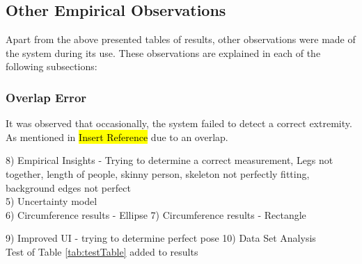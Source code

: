 \subsection{Other Empirical Observations}

Apart from the above presented tables of results, other observations were made of the system during its use. These observations are explained in each of the following subsections:

\subsubsection{Overlap Error}
It was observed that occasionally, the system failed to detect a correct extremity. As mentioned in \hl{Insert Reference} due to an overlap. 


8) Empirical Insights - Trying to determine a correct measurement, Legs not together, length of people, skinny person, skeleton not perfectly fitting, background edges not perfect \\

5) Uncertainty model\\

6) Circumference results - Ellipse
7) Circumference results - Rectangle


9) Improved UI - trying to determine perfect pose
10) Data Set Analysis\\

Test of Table \ref{tab:testTable} added to results

